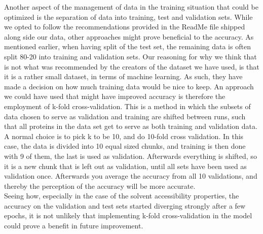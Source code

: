    Another aspect of the management of data in the training situation that could be optimized is the separation of data into training, test and validation sets. While we opted to follow the recommendations provided in the ReadMe file shipped along side our data, other approaches might prove beneficial to the accuracy. As mentioned earlier, when having split of the test set, the remaining data is often split 80-20 into training and validation sets. Our reasoning for why we think that is not what was recommended by the creators of the dataset we have used, is that it is a rather small dataset, in terms of machine learning. As such, they have made a decision on how much training data would be nice to keep. An approach we could have used that might have improved accuracy is therefore the employment of k-fold cross-validation. This is a method in which the subsets of data chosen to serve as validation and training are shifted between runs, such that all proteins in the data set get to serve as both training and validation data. A normal choice is to pick k to be 10, and do 10-fold cross validation. In this case, the data is divided into 10 equal sized chunks, and training is then done with 9 of them, the last is used as validation. Afterwards everything is shifted, so it is a new chunk that is left out as validation, until all sets have been used as validation once. Afterwards you average the accuracy from all 10 validations, and thereby the perception of the accuracy will be more accurate.\\ Seeing how, especially in the case of the solvent accessibility properties, the accuracy on the validation and test sets started diverging strongly after a few epochs, it is not unlikely that implementing k-fold cross-validation in the model could prove a benefit in future improvement. 

